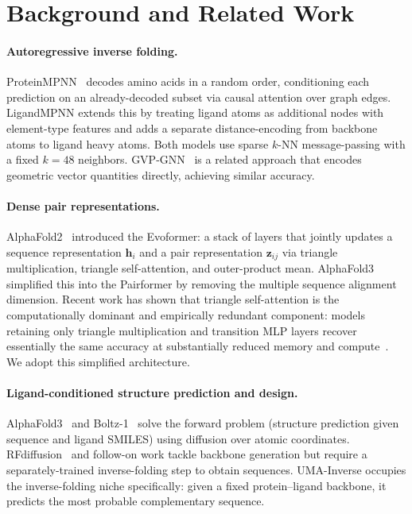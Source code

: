 \documentclass[11pt,letterpaper]{article}
\newcommand{\bz}{\mathbf{z}}
\newcommand{\bh}{\mathbf{h}}
\begin{document}
\section{Background and Related Work}
\label{sec:background}

\paragraph{Autoregressive inverse folding.}
ProteinMPNN~\citep{dauparas2022robust} decodes amino acids in a random order, conditioning each
prediction on an already-decoded subset via causal attention over graph edges. LigandMPNN extends
this by treating ligand atoms as additional nodes with element-type features and adds a
separate distance-encoding from backbone atoms to ligand heavy atoms. Both models use sparse
$k$-NN message-passing with a fixed $k{=}48$ neighbors. GVP-GNN~\citep{jing2021learning} is a
related approach that encodes geometric vector quantities directly, achieving similar accuracy.

\paragraph{Dense pair representations.}
AlphaFold2~\citep{jumper2021highly} introduced the Evoformer: a stack of layers that jointly
updates a sequence representation $\bh_i$ and a pair representation $\bz_{ij}$ via triangle
multiplication, triangle self-attention, and outer-product mean. AlphaFold3 simplified this into
the Pairformer by removing the multiple sequence alignment dimension. Recent work has shown that
triangle self-attention is the computationally dominant and empirically redundant component: models
retaining only triangle multiplication and transition MLP layers recover essentially the same
accuracy at substantially reduced memory and compute~\citep{pearl2026}. We adopt this simplified
architecture.

\paragraph{Ligand-conditioned structure prediction and design.}
AlphaFold3~\citep{abramson2024accurate} and Boltz-1~\citep{wohlwend2024boltz} solve the forward
problem (structure prediction given sequence and ligand SMILES) using diffusion over atomic
coordinates. RFdiffusion~\citep{watson2023novo} and follow-on work tackle backbone generation but
require a separately-trained inverse-folding step to obtain sequences.
UMA-Inverse occupies the inverse-folding niche specifically: given a fixed protein--ligand backbone,
it predicts the most probable complementary sequence.
\end{document}
